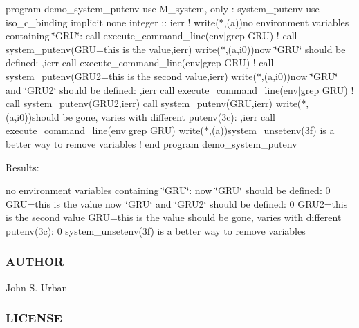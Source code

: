 program demo\+\_\+system\+\_\+putenv use M\+\_\+system, only \+: system\+\_\+putenv use iso\+\_\+c\+\_\+binding implicit none integer \+:\+: ierr ! write($\ast$,\textquotesingle{}(a)\textquotesingle{})\textquotesingle{}no environment variables containing \char`\"{}\+G\+R\+U\char`\"{}\+:\textquotesingle{} call execute\+\_\+command\+\_\+line(\textquotesingle{}env$\vert$grep G\+RU\textquotesingle{}) ! call system\+\_\+putenv(\textquotesingle{}G\+RU=this is the value\textquotesingle{},ierr) write($\ast$,\textquotesingle{}(a,i0)\textquotesingle{})\textquotesingle{}now \char`\"{}\+G\+R\+U\char`\"{} should be defined\+: \textquotesingle{},ierr call execute\+\_\+command\+\_\+line(\textquotesingle{}env$\vert$grep G\+RU\textquotesingle{}) ! call system\+\_\+putenv(\textquotesingle{}G\+R\+U2=this is the second value\textquotesingle{},ierr) write($\ast$,\textquotesingle{}(a,i0)\textquotesingle{})\textquotesingle{}now \char`\"{}\+G\+R\+U\char`\"{} and \char`\"{}\+G\+R\+U2\char`\"{} should be defined\+: \textquotesingle{},ierr call execute\+\_\+command\+\_\+line(\textquotesingle{}env$\vert$grep G\+RU\textquotesingle{}) ! call system\+\_\+putenv(\textquotesingle{}G\+R\+U2\textquotesingle{},ierr) call system\+\_\+putenv(\textquotesingle{}G\+RU\textquotesingle{},ierr) write($\ast$,\textquotesingle{}(a,i0)\textquotesingle{})\textquotesingle{}should be gone, varies with different putenv(3c)\+: \textquotesingle{},ierr call execute\+\_\+command\+\_\+line(\textquotesingle{}env$\vert$grep G\+RU\textquotesingle{}) write($\ast$,\textquotesingle{}(a)\textquotesingle{})\textquotesingle{}system\+\_\+unsetenv(3f) is a better way to remove variables\textquotesingle{} ! end program demo\+\_\+system\+\_\+putenv

Results\+:

no environment variables containing \char`\"{}\+G\+R\+U\char`\"{}\+: now \char`\"{}\+G\+R\+U\char`\"{} should be defined\+: 0 G\+RU=this is the value now \char`\"{}\+G\+R\+U\char`\"{} and \char`\"{}\+G\+R\+U2\char`\"{} should be defined\+: 0 G\+R\+U2=this is the second value G\+RU=this is the value should be gone, varies with different putenv(3c)\+: 0 system\+\_\+unsetenv(3f) is a better way to remove variables

\subsubsection*{A\+U\+T\+H\+OR}

John S. Urban \subsubsection*{L\+I\+C\+E\+N\+SE}

